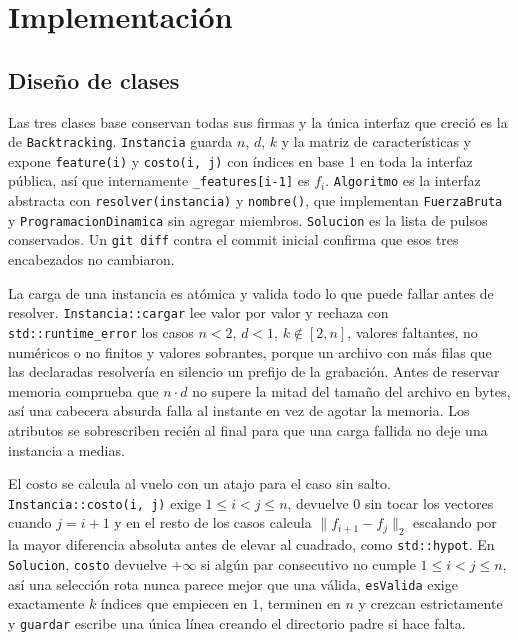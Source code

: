 \section{Implementación}\label{sec:implementacion}

\subsection{Diseño de clases}\label{sec:clases}

\begin{sloppypar}
Las tres clases base conservan todas sus firmas y la única interfaz que creció es la de \texttt{Backtracking}. \texttt{Instancia} guarda $n$, $d$, $k$ y la matriz de características y expone \texttt{feature(i)} y \texttt{costo(i, j)} con índices en base 1 en toda la interfaz pública, así que internamente \texttt{\_features[i-1]} es $f_i$. \texttt{Algoritmo} es la interfaz abstracta con \texttt{resolver(instancia)} y \texttt{nombre()}, que implementan \texttt{FuerzaBruta} y \texttt{Programacion\-Dinamica} sin agregar miembros. \texttt{Solucion} es la lista de pulsos conservados. Un \texttt{git diff} contra el commit inicial confirma que esos tres encabezados no cambiaron.
\end{sloppypar}

La carga de una instancia es atómica y valida todo lo que puede fallar antes de resolver. \texttt{Instancia::cargar} lee valor por valor y rechaza con \texttt{std::runtime\_error} los casos $n < 2$, $d < 1$, $k \notin [2, n]$, valores faltantes, no numéricos o no finitos y valores sobrantes, porque un archivo con más filas que las declaradas resolvería en silencio un prefijo de la grabación. Antes de reservar memoria comprueba que $n \cdot d$ no supere la mitad del tamaño del archivo en bytes, así una cabecera absurda falla al instante en vez de agotar la memoria. Los atributos se sobrescriben recién al final para que una carga fallida no deje una instancia a medias.

El costo se calcula al vuelo con un atajo para el caso sin salto. \texttt{Instancia::costo(i, j)} exige $1 \le i < j \le n$, devuelve $0$ sin tocar los vectores cuando $j = i + 1$ y en el resto de los casos calcula $\lVert f_{i+1} - f_j \rVert_2$ escalando por la mayor diferencia absoluta antes de elevar al cuadrado, como \texttt{std::hypot}. En \texttt{Solucion}, \texttt{costo} devuelve $+\infty$ si algún par consecutivo no cumple $1 \le i < j \le n$, así una selección rota nunca parece mejor que una válida, \texttt{esValida} exige exactamente $k$ índices que empiecen en $1$, terminen en $n$ y crezcan estrictamente y \texttt{guardar} escribe una única línea creando el directorio padre si hace falta.

